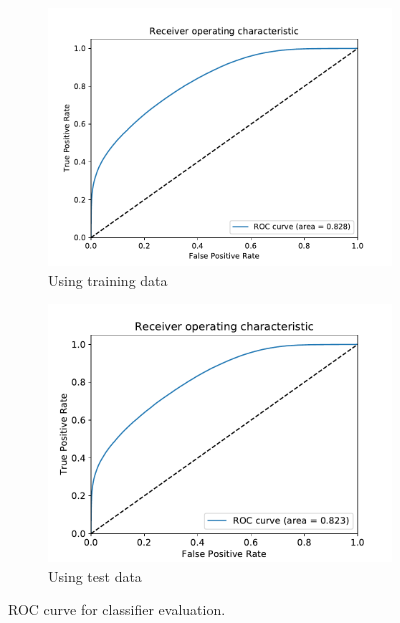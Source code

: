 \begin{figure}[h]
    \centering
    \begin{subfigure}{0.5\textwidth}
        \includegraphics[scale=.6]{assets/chap04/roc_train.pdf}
        \caption{Using training data}
        \label{fig:ch_4_roc_train}
    \end{subfigure}
    
    \begin{subfigure}{0.5\textwidth}
        \includegraphics[scale=.6]{assets/chap04/roc_test.pdf}
        \caption{Using test data}
        \label{fig:ch_4_roc_test}
    \end{subfigure}
    \caption{ROC curve for classifier evaluation.}
    \label{fig:ch_4_roc}
\end{figure}